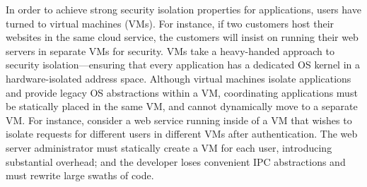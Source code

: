 In order to achieve strong security isolation properties for applications,
users have turned to virtual machines (VMs).
For instance, if two customers host their websites in the same cloud service,
the customers will insist on running their web servers in separate VMs for security.
VMs take a heavy-handed approach to security isolation---ensuring 
that every application has a dedicated OS kernel in a hardware-isolated address space.
Although virtual machines isolate
applications and provide legacy OS abstractions within a VM, 
coordinating applications must be statically placed in the same VM,
and cannot dynamically move to a separate VM.
For instance, consider a web service running
inside of a VM that wishes to isolate requests for different users in
different VMs after authentication.  The web server administrator must
statically create a VM for each user, introducing substantial
overhead; and the developer loses convenient IPC abstractions and
must rewrite large swaths of code.
